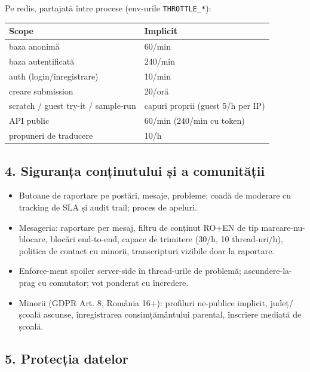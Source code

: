 \documentclass[
]{article}
\newcounter{none} %
\providecommand{\tightlist}{%
  \setlength{\itemsep}{0pt}\setlength{\parskip}{0pt}}
\begin{document}
Pe redis, partajată între procese (env-urile \texttt{THROTTLE\_*}):

{\def\LTcaptype{none} %
\begin{longtable}[]{@{}ll@{}}
\toprule\noalign{}
Scope & Implicit \\
\midrule\noalign{}
\endhead
\bottomrule\noalign{}
\endlastfoot
baza anonimă & 60/min \\
baza autentificată & 240/min \\
auth (login/înregistrare) & 10/min \\
creare submission & 20/oră \\
scratch / guest try-it / sample-run & capuri proprii (guest 5/h per
IP) \\
API public & 60/min (240/min cu token) \\
propuneri de traducere & 10/h \\
\end{longtable}
}

\subsection{4. Siguranța conținutului și a
comunității}\label{4-siguranux21ba-conux21binutului-ux219i-a-comunitux103ux21bii}

\begin{itemize}
\tightlist
\item
  Butoane de raportare pe postări, mesaje, probleme; coadă de moderare
  cu tracking de SLA și audit trail; proces de apeluri.
\item
  Mesageria: raportare per mesaj, filtru de conținut RO+EN de tip
  marcare-nu-blocare, blocări end-to-end, capace de trimitere (30/h, 10
  thread-uri/h), politica de contact cu minorii, transcripturi vizibile
  doar la raportare.
\item
  Enforce-ment spoiler server-side în thread-urile de problemă;
  ascundere-la-prag cu comutator; vot ponderat cu încredere.
\item
  Minorii (GDPR Art. 8, România 16+): profiluri ne-publice implicit,
  județ/școală ascunse, înregistrarea consimțământului parental,
  înscriere mediată de școală.
\end{itemize}

\subsection{5. Protecția datelor}\label{5-protecux21bia-datelor}
\end{document}
